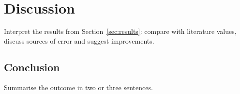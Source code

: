 \section{Discussion}
\label{sec:discussion}

Interpret the results from Section~\ref{sec:results}: compare with literature
values, discuss sources of error and suggest improvements.

\subsection{Conclusion}
Summarise the outcome in two or three sentences.
